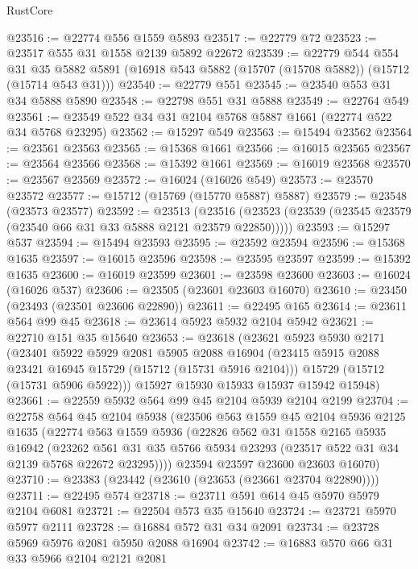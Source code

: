 \begin{lexlean}{RustCore}
\begin{coremodule}
@23516 := @22774 @556 @1559 @5893
@23517 := @22779 @72
@23523 := @23517 @555 @31 @1558 @2139 @5892 @22672
@23539 := @22779
    @544
    @554
    @31
    @35
    @5882
    @5891
    (@16918 @543 @5882 (@15707 (@15708 @5882)) (@15712 (@15714 @543 @31)))
@23540 := @22779 @551
@23545 := @23540 @553 @31 @34 @5888 @5890
@23548 := @22798 @551 @31 @5888
@23549 := @22764 @549
@23561 := @23549 @522 @34 @31 @2104 @5768 @5887 @1661 (@22774 @522 @34 @5768 @23295)
@23562 := @15297 @549
@23563 := @15494 @23562
@23564 := @23561 @23563
@23565 := @15368 @1661
@23566 := @16015 @23565
@23567 := @23564 @23566
@23568 := @15392 @1661
@23569 := @16019 @23568
@23570 := @23567 @23569
@23572 := @16024 (@16026 @549)
@23573 := @23570 @23572
@23577 := @15712 (@15769 (@15770 @5887) @5887)
@23579 := @23548 (@23573 @23577)
@23592 := @23513
    (@23516 (@23523 (@23539 (@23545 @23579 (@23540 @66 @31 @33 @5888 @2121 @23579 @22850)))))
@23593 := @15297 @537
@23594 := @15494 @23593
@23595 := @23592 @23594
@23596 := @15368 @1635
@23597 := @16015 @23596
@23598 := @23595 @23597
@23599 := @15392 @1635
@23600 := @16019 @23599
@23601 := @23598 @23600
@23603 := @16024 (@16026 @537)
@23606 := @23505 (@23601 @23603 @16070)
@23610 := @23450 (@23493 (@23501 @23606 @22890))
@23611 := @22495 @165
@23614 := @23611 @564 @99 @45
@23618 := @23614 @5923 @5932 @2104 @5942
@23621 := @22710 @151 @35 @15640
@23653 := @23618
    (@23621
      @5923
      @5930
      @2171
      (@23401
        @5922
        @5929
        @2081
        @5905
        @2088
        @16904
        (@23415 @5915 @2088 @23421 @16945 @15729 (@15712 (@15731 @5916 @2104)))
        @15729
        (@15712 (@15731 @5906 @5922)))
      @15927
      @15930
      @15933
      @15937
      @15942
      @15948)
@23661 := @22559 @5932 @564 @99 @45 @2104 @5939 @2104 @2199
@23704 := @22758
    @564
    @45
    @2104
    @5938
    (@23506
      @563
      @1559
      @45
      @2104
      @5936
      @2125
      @1635
      (@22774
        @563
        @1559
        @5936
        (@22826
          @562
          @31
          @1558
          @2165
          @5935
          @16942
          (@23262 @561 @31 @35 @5766 @5934 @23293 (@23517 @522 @31 @34 @2139 @5768 @22672 @23295))))
      @23594
      @23597
      @23600
      @23603
      @16070)
@23710 := @23383 (@23442 (@23610 (@23653 (@23661 @23704 @22890))))
@23711 := @22495 @574
@23718 := @23711 @591 @614 @45 @5970 @5979 @2104 @6081
@23721 := @22504 @573 @35 @15640
@23724 := @23721 @5970 @5977 @2111
@23728 := @16884 @572 @31 @34 @2091
@23734 := @23728 @5969 @5976 @2081 @5950 @2088 @16904
@23742 := @16883 @570 @66 @31 @33 @5966 @2104 @2121 @2081

\end{coremodule}
\end{lexlean}
